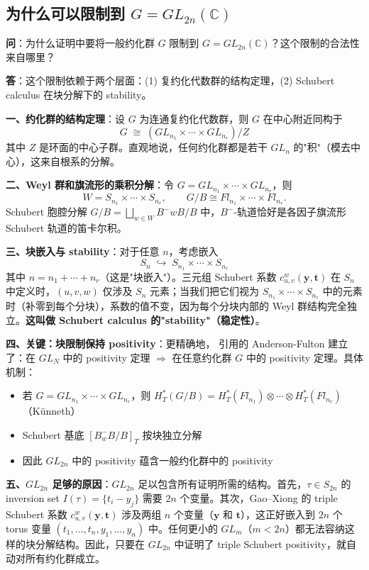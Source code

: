 \subsection{为什么可以限制到 $G = GL_{2n}(\mathbb{C})$}\label{sec:qa-GL-restriction}
\textbf{问}：为什么证明中要将一般约化群 $G$ 限制到 $G = GL_{2n}(\mathbb{C})$？这个限制的合法性来自哪里？

\textbf{答}：这个限制依赖于两个层面：(1) 复约化代数群的结构定理，(2) Schubert calculus 在块分解下的 stability。

\textbf{一、约化群的结构定理}：设 $G$ 为连通复约化代数群，则 $G$ 在中心附近同构于
$$G \;\cong\; (GL_{n_1} \times \cdots \times GL_{n_r}) / Z$$
其中 $Z$ 是环面的中心子群。直观地说，任何约化群都是若干 $GL_n$ 的"积"（模去中心），这来自根系的分解。

\textbf{二、Weyl 群和旗流形的乘积分解}：令 $G = GL_{n_1} \times \cdots \times GL_{n_r}$，则
$$W = S_{n_1} \times \cdots \times S_{n_r}, \qquad G/B \cong Fl_{n_1} \times \cdots \times Fl_{n_r}.$$
Schubert 胞腔分解 $G/B = \bigsqcup_{w \in W} B^-wB/B$ 中，$B^-$-轨道恰好是各因子旗流形 Schubert 轨道的笛卡尔积。

\textbf{三、块嵌入与 stability}：对于任意 $n$，考虑嵌入
$$S_n \;\hookrightarrow\; S_{n_1} \times \cdots \times S_{n_r}$$
其中 $n = n_1 + \cdots + n_r$（这是"块嵌入"）。三元组 Schubert 系数 $c_{u,v}^w(\mathbf{y},\mathbf{t})$ 在 $S_n$ 中定义时，$(u,v,w)$ 仅涉及 $S_n$ 元素；当我们把它们视为 $S_{n_1} \times \cdots \times S_{n_r}$ 中的元素时（补零到每个分块），系数的值不变，因为每个分块内部的 Weyl 群结构完全独立。\textbf{这叫做 Schubert calculus 的"stability"（稳定性）}。

\textbf{四、关键：块限制保持 positivity}：更精确地，\cite{GX2025} 引用的 Anderson-Fulton \cite[Section 10.4]{AndersonFulton} 建立了：在 $GL_N$ 中的 positivity 定理 $\Longrightarrow$ 在任意约化群 $G$ 中的 positivity 定理。具体机制：
\begin{itemize}
\item 若 $G = GL_{n_1} \times \cdots \times GL_{n_r}$，则 $H_T^*(G/B) = H_T^*(Fl_{n_1}) \otimes \cdots \otimes H_T^*(Fl_{n_r})$（Künneth）
\item Schubert 基底 $[B^-_wB/B]_T$ 按块独立分解
\item 因此 $GL_{2n}$ 中的 positivity 蕴含一般约化群中的 positivity
\end{itemize}

\textbf{五、$GL_{2n}$ 足够的原因}：$GL_{2n}$ 足以包含所有证明所需的结构。首先，$\tau \in S_{2n}$ 的 inversion set $I(\tau) = \{t_i - y_j\}$ 需要 $2n$ 个变量。其次，Gao--Xiong \cite{GX2025} 的 triple Schubert 系数 $c_{u,v}^w(\mathbf{y},\mathbf{t})$ 涉及两组 $n$ 个变量（$\mathbf{y}$ 和 $\mathbf{t}$），这正好嵌入到 $2n$ 个 torus 变量 $(t_1,\ldots,t_n, y_1,\ldots,y_n)$ 中。任何更小的 $GL_m$（$m < 2n$）都无法容纳这样的块分解结构。因此，只要在 $GL_{2n}$ 中证明了 triple Schubert positivity，就自动对所有约化群成立。

